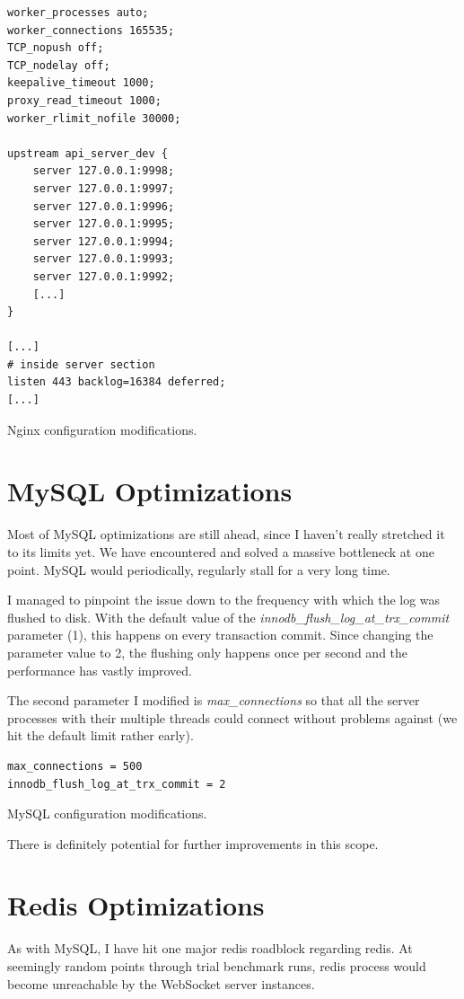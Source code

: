 \documentclass{uvamscse}
\begin{document}
\begin{sourcecode}[h]
\begin{lstlisting}[style=mono]
worker_processes auto;
worker_connections 165535;
TCP_nopush off;
TCP_nodelay off;
keepalive_timeout 1000;
proxy_read_timeout 1000;
worker_rlimit_nofile 30000;

upstream api_server_dev {
    server 127.0.0.1:9998;
    server 127.0.0.1:9997;
    server 127.0.0.1:9996;
    server 127.0.0.1:9995;
    server 127.0.0.1:9994;
    server 127.0.0.1:9993;
    server 127.0.0.1:9992;
    [...]
}

[...]
# inside server section
listen 443 backlog=16384 deferred;
[...]
\end{lstlisting}
\caption{Nginx configuration modifications.}
\label{lstlisting:nginx}
\end{sourcecode}

\section{MySQL Optimizations}
Most of MySQL optimizations are still ahead, since I haven't really stretched it to its limits yet. We have encountered and solved a massive bottleneck at one point. MySQL would periodically, regularly stall for a very long time.

I managed to pinpoint the issue down to the frequency with which the log was flushed to disk. With the default value of the \textit{innodb\_flush\_log\_at\_trx\_commit} parameter (1), this happens on every transaction commit. Since changing the parameter value to 2, the flushing only happens once per second and the performance has vastly improved.

The second parameter I modified is \textit{max\_connections} so that all the server processes with their multiple threads could connect without problems against (we hit the default limit rather early).

\begin{sourcecode}[h]
\begin{lstlisting}[style=mono]
max_connections = 500
innodb_flush_log_at_trx_commit = 2
\end{lstlisting}
\caption{MySQL configuration modifications.}
\label{lstlisting:MySQL}
\end{sourcecode}

There is definitely potential for further improvements in this scope.

\section{Redis Optimizations}
As with MySQL, I have hit one major redis roadblock regarding redis. At seemingly random points through trial benchmark runs, redis process would become unreachable by the WebSocket server instances.
\end{document}
